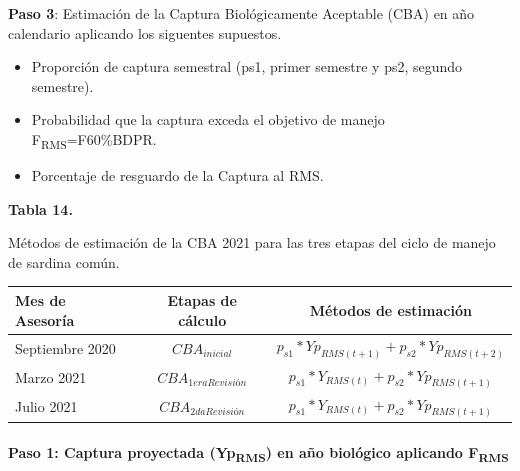 \documentclass[
  spanish,
]{article}
\providecommand{\tightlist}{%
  \setlength{\itemsep}{0pt}\setlength{\parskip}{0pt}}
\begin{document}
\textbf{Paso 3}: Estimación de la Captura Biológicamente Aceptable (CBA)
en año calendario aplicando los siguentes supuestos.

\begin{itemize}
\tightlist
\item
  Proporción de captura semestral (ps1, primer semestre y ps2, segundo
  semestre).
\item
  Probabilidad que la captura exceda el objetivo de manejo
  F\textsubscript{RMS}=F60\%BDPR.
\item
  Porcentaje de resguardo de la Captura al RMS.
\end{itemize}

\vspace{0.5cm}
\small

\begin{center} 
 \textbf{Tabla 14.}
 \end{center}
 \begin{center} 
 \vspace{-0.2cm} Métodos de estimación de la CBA 2021 para las tres etapas del ciclo de manejo de sardina común.
 \end{center}
 \vspace{-0.2cm}

\begin{table}[h]
  \centering
  \resizebox{12cm}{!} {
  \begin{tabular}{|l|c|c|}
  \hline
  Mes de Asesoría & Etapas de cálculo      & Métodos de estimación \\ \hline
  Septiembre 2020 & $CBA_{inicial}$      & $p_{s1} * Yp_{RMS(t+1)} + p_{s2} * Yp_{RMS(t+2)}$ \\
  Marzo 2021      & $CBA_{1eraRevisión}$ & $p_{s1} * Y_{RMS(t)} + p_{s2} * Yp_{RMS(t+1)}$ \\
  Julio 2021      & $CBA_{2daRevisión}$  & $p_{s1} * Y_{RMS(t)} + p_{s2} * Yp_{RMS(t+1)}$ \\ \hline
  \end{tabular}}
    \end{table}

\normalsize

\hypertarget{paso-1-captura-proyectada-yprms-en-auxf1o-bioluxf3gico-aplicando-frms}{%
\paragraph{\texorpdfstring{Paso 1: Captura proyectada
(Yp\textsubscript{RMS}) en año biológico aplicando
F\textsubscript{RMS}}{Paso 1: Captura proyectada (YpRMS) en año biológico aplicando FRMS}}\label{paso-1-captura-proyectada-yprms-en-auxf1o-bioluxf3gico-aplicando-frms}}
\end{document}
